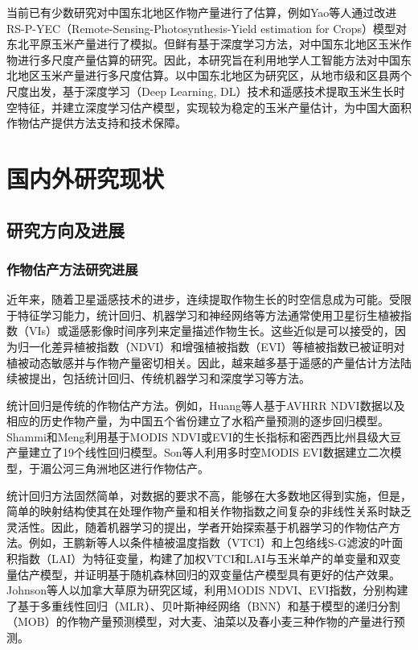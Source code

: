 \par 当前已有少数研究对中国东北地区作物产量进行了估算，例如Yao等人通过改进RS-P-YEC（Remote-Sensing-Photosynthesis-Yield estimation for Crops）模型对东北平原玉米产量进行了模拟\cite{yao2015estimation}。但鲜有基于深度学习方法，对中国东北地区玉米作物进行多尺度产量估算的研究。因此，本研究旨在利用地学人工智能方法对中国东北地区玉米产量进行多尺度估算。以中国东北地区为研究区，从地市级和区县两个尺度出发，基于深度学习（Deep Learning, DL）技术和遥感技术提取玉米生长时空特征，并建立深度学习估产模型，实现较为稳定的玉米产量估计，为中国大面积作物估产提供方法支持和技术保障。

\section{国内外研究现状}

\subsection{研究方向及进展}

\subsubsection{作物估产方法研究进展}

\par 近年来，随着卫星遥感技术的进步，连续提取作物生长的时空信息成为可能\cite{WEISS2020111402}。受限于特征学习能力，统计回归、机器学习和神经网络等方法通常使用卫星衍生植被指数（VIs）\cite{shammi2021use, stas2016comparison}或遥感影像时间序列\cite{8367850, nagy2018wheat}来定量描述作物生长。这些近似是可以接受的，因为归一化差异植被指数（NDVI）和增强植被指数（EVI）等植被指数已被证明对植被动态敏感\cite{sellers1987canopy, tucker1979red}并与作物产量密切相关\cite{shanahan2001use}。因此，越来越多基于遥感的产量估计方法陆续被提出，包括统计回归、传统机器学习和深度学习等方法。

\par 统计回归是传统的作物估产方法。例如，Huang等人\cite{huang2013remotely}基于AVHRR NDVI数据以及相应的历史作物产量，为中国五个省份建立了水稻产量预测的逐步回归模型。Shammi和Meng\cite{shammi2021use}利用基于MODIS NDVI或EVI的生长指标和密西西比州县级大豆产量建立了19个线性回归模型。Son等人\cite{son2014comparative}利用多时空MODIS EVI数据建立二次模型，于湄公河三角洲地区进行作物估产。

\par 统计回归方法固然简单，对数据的要求不高，能够在大多数地区得到实施，但是，简单的映射结构使其在处理作物产量和相关作物指数之间复杂的非线性关系时缺乏灵活性\cite{balaghi2008empirical, ren2008regional}。因此，随着机器学习的提出，学者开始探索基于机器学习的作物估产方法。例如，王鹏新等人\cite{NYJX201907026}以条件植被温度指数（VTCI）和上包络线S-G滤波的叶面积指数（LAI）为特征变量，构建了加权VTCI和LAI与玉米单产的单变量和双变量估产模型，并证明基于随机森林回归的双变量估产模型具有更好的估产效果。Johnson等人\cite{johnson2016crop}以加拿大草原为研究区域，利用MODIS NDVI、EVI指数，分别构建了基于多重线性回归（MLR）、贝叶斯神经网络（BNN）和基于模型的递归分割（MOB）的作物产量预测模型，对大麦、油菜以及春小麦三种作物的产量进行预测。


